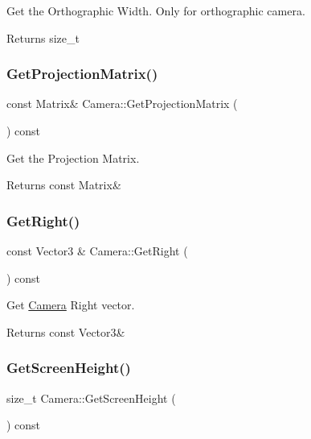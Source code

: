 Get the Orthographic Width. Only for orthographic camera. 

\begin{DoxyReturn}{Returns}
size\+\_\+t 
\end{DoxyReturn}
\mbox{\label{classCamera_a51e9a67637aeb424e1e173eae22d23c1}} 
\subsubsection{\texorpdfstring{Get\+Projection\+Matrix()}{GetProjectionMatrix()}}
{\footnotesize\ttfamily const Matrix\& Camera\+::\+Get\+Projection\+Matrix (\begin{DoxyParamCaption}{ }\end{DoxyParamCaption}) const\hspace{0.3cm}{\ttfamily [inline]}}



Get the Projection Matrix. 

\begin{DoxyReturn}{Returns}
const Matrix\& 
\end{DoxyReturn}
\mbox{\label{classCamera_afd3c91fa693b8a6fb74d2e4708f3aae2}} 
\subsubsection{\texorpdfstring{Get\+Right()}{GetRight()}}
{\footnotesize\ttfamily const Vector3 \& Camera\+::\+Get\+Right (\begin{DoxyParamCaption}{ }\end{DoxyParamCaption}) const}



Get \hyperlink{classCamera}{Camera} Right vector. 

\begin{DoxyReturn}{Returns}
const Vector3\& 
\end{DoxyReturn}
\mbox{\label{classCamera_ad6bf28a11aa95a86497ad1e0d476d95b}} 
\subsubsection{\texorpdfstring{Get\+Screen\+Height()}{GetScreenHeight()}}
{\footnotesize\ttfamily size\+\_\+t Camera\+::\+Get\+Screen\+Height (\begin{DoxyParamCaption}{ }\end{DoxyParamCaption}) const}



